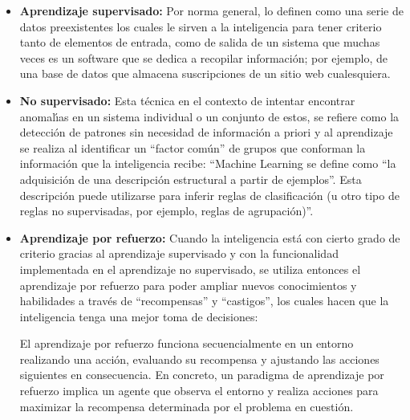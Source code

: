 \begin{itemize}
	\item \textbf{Aprendizaje supervisado:}
	      Por norma general, \textcite{Janiesch2021} lo definen como una serie de datos
	      preexistentes los cuales le sirven a la inteligencia para tener criterio tanto
	      de elementos de entrada, como de salida de un sistema que muchas veces es un
	      software que se dedica a recopilar informaci\'on; por ejemplo, de una base de
	      datos que almacena suscripciones de un sitio web cualesquiera.

	\item \textbf{No supervisado:}
	      Esta t\'ecnica en el contexto de intentar encontrar anomal\'{\i}as en un sistema
	      individual o un conjunto de estos, se refiere como la detecci\'on de patrones
	      sin necesidad de informaci\'on a priori y al aprendizaje se realiza al
	      identificar un ``factor com\'un'' de grupos que conforman la informaci\'on que la
	      inteligencia recibe: ``Machine Learning se define como ``la adquisici\'on de una
	      descripci\'on estructural a partir de ejemplos''. Esta descripci\'on puede
	      utilizarse para inferir reglas de clasificaci\'on (u otro tipo de reglas no
	      supervisadas, por ejemplo, reglas de agrupaci\'on)''.
	      \parencite[Witten et al., 2011, como se cita en][]{Singh2022}

	\item \textbf{Aprendizaje por refuerzo:}
	      Cuando la inteligencia est\'a con cierto grado de criterio gracias al aprendizaje
	      supervisado y con la funcionalidad implementada en el aprendizaje no
	      supervisado, se utiliza entonces el aprendizaje por refuerzo para poder ampliar
	      nuevos conocimientos y habilidades a trav\'es de ``recompensas'' y ``castigos'',
	      los cuales hacen que la inteligencia tenga una mejor toma de decisiones:

	      \begin{displayquote}
		      El aprendizaje por refuerzo funciona secuencialmente en un entorno
		      realizando una acci\'on, evaluando su recompensa y ajustando las acciones
		      siguientes en consecuencia. En concreto, un paradigma de aprendizaje por
		      refuerzo implica un agente que observa el entorno y realiza acciones para
		      maximizar la recompensa determinada por el problema en cuesti\'on.
		      \parencite[Richard S Sutton y Andrew G Barto., 2018, como se cita en][]
		      {Chen2023}
	      \end{displayquote}


\end{itemize}
